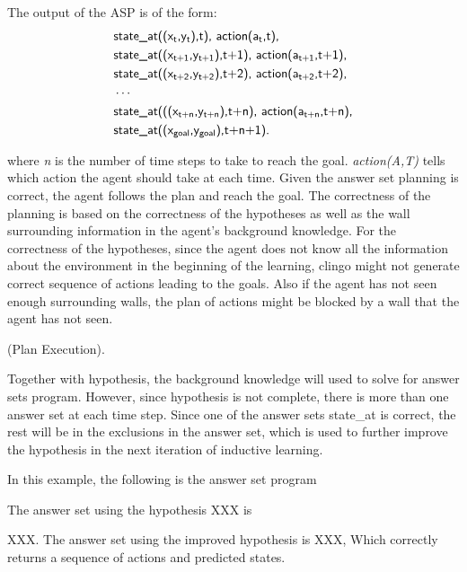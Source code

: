The output of the ASP is of the form:
\begin{equation}
\begin{split}
&\textsf{state\_at((x\textsubscript{t},y\textsubscript{t}),t), action(a\textsubscript{t},t),}\\
&\textsf{state\_at((x\textsubscript{t+1},y\textsubscript{t+1}),t+1), action(a\textsubscript{t+1},t+1),}\\
&\textsf{state\_at((x\textsubscript{t+2},y\textsubscript{t+2}),t+2), action(a\textsubscript{t+2},t+2),}\\
&\cdots\\
&\textsf{state\_at(((x\textsubscript{t+n},y\textsubscript{t+n}),t+n), action(a\textsubscript{t+n},t+n),}\\
&\textsf{state\_at((x\textsubscript{goal},y\textsubscript{goal}),t+n+1).} 
\end{split}
\end{equation}

where \textit{n} is the number of time steps to take to reach the goal. 
\textit{action(A,T)} tells which action the agent should take at each time.
Given the answer set planning is correct, the agent follows the plan and reach the goal. 
The correctness of the planning is based on the correctness of the hypotheses as well as the wall surrounding information in the agent's background knowledge. 
For the correctness of the hypotheses, since the agent does not know all the information about the environment in the beginning of the learning,   
clingo might not generate correct sequence of actions leading to the goals.
Also if the agent has not seen enough surrounding walls, the plan of actions might be blocked by a wall that the agent has not seen. 

\begin{examp} \normalfont (Plan Execution).

Together with hypothesis, the background knowledge will used to solve for answer sets program. 
However, since hypothesis is not complete, there is more than one answer set at each time step. 
Since one of the answer sets state\_at is correct, the rest will be in the exclusions in the answer set, 
which is used to further improve the hypothesis in the next iteration of inductive learning.

In this example, the following is the answer set program

The answer set using the hypothesis XXX is 

XXX. 
The answer set using the improved hypothesis is XXX, 
Which correctly returns a sequence of actions and predicted states. 

\end{examp}

